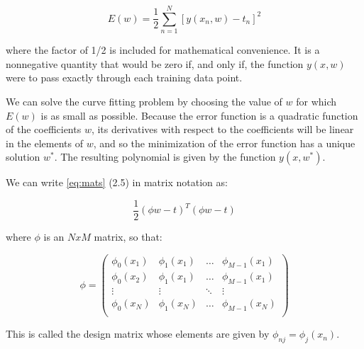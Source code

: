 \begin{Equation}[!h]
	\centering
	\begin{equation}
		E(w)=\frac{1}{2} \sum_{n=1}^{N} [y(x_n,w)-t_n]^2
	\end{equation}
	\label{eq:mats}
\end{Equation}

where the factor of 1/2 is included for mathematical convenience. It is a nonnegative quantity that would be zero if, and only if, the function $y(x, w)$ were to pass exactly through each training data point.

We can solve the curve fitting problem by choosing the value of $w$ for which $E(w)$ is as small as possible. Because the error function is a quadratic function of the coefficients $w$, its derivatives with respect to the coefficients will be linear in the elements of $w$, and so the minimization of the error function has a unique solution $w^*$. The resulting polynomial is given by the function $y(x, w^*)$.

We can  write \ref{eq:mats} (2.5) in matrix notation as:

\begin{Equation}[!h]
	\centering
	\begin{equation}
	\frac{1}{2} (\phi w - t)^T (\phi w - t)
	\end{equation}
	\label{eq:mathmodelaada}
\end{Equation}

\noindent where $\phi$ is an $N x M$ matrix, so that:
 

\begin{Equation}[!htb]
	\centering
	\begin{equation}
	\phi =
		\begin{pmatrix}
			\phi_0(x_1) & \phi_1(x_1) & \dots & \phi_{M-1}(x_1) \\
			\phi_0(x_2) & \phi_1(x_1) & \dots & \phi_{M-1}(x_1) \\
			\vdots & \vdots & \ddots & \vdots \\
			\phi_0(x_N) & \phi_1(x_N) & \dots & \phi_{M-1}(x_N) \\
		\end{pmatrix}
	\end{equation}
	\caption[Design matrix.]{This is called the design matrix whose elements are given by $\phi_{nj} = \phi_j(x_n)$.}
	\label{eq:hommatrix}
\end{Equation}

